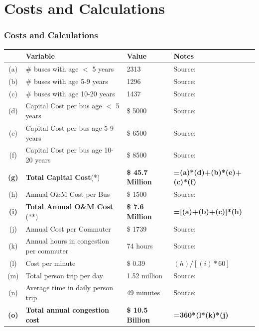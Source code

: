 \documentclass{beamer}
\begin{document}
\section{Costs and Calculations}
\begin{frame}
  \frametitle{Costs and Calculations}
  \begin{table}[h]
\centering
\tiny
\renewcommand{\arraystretch}{1.1}
\begin{tabular}{c l l l}
\hline
 	& Variable 							& Value 				& Notes 						\\\hline\hline
(a)	& \# buses with age $<$ 5 years				& 2313				& Source:	 \cite{am1}	\\
(b)	& \# buses with age 5-9 years				& 1296				& Source:	\cite{am1}					\\
(c)	& \# buses with age 10-20 years			& 1437				& Source:	\cite{am1}					\\
(d)	& Capital Cost per bus age $<$ 5 years		& \$ 5000				& Source:	\cite{am1}		\\
(e)	& Capital Cost per bus age 5-9 years		& \$ 6500				& Source:	\cite{am1}		\\
(f)	& Capital Cost per bus age 10-20 years		& \$ 8500				& Source:	\cite{am1}		\\
\textbf{(g)}	& \textbf{Total Capital Cost}(*)			& \textbf{\$ 45.7 Million}	& \textbf{=(a)*(d)+(b)*(e)+(c)*(f)}			\\
(h)	& Annual O\&M Cost per Bus				& \$ 1500				& Source:	\cite{am1}	\\
\textbf{(i)}	& \textbf{Total Annual O\&M Cost} (**)	& \textbf{\$
  7.6 Million}	& \textbf{=[(a)+(b)+(c)]*(h)}\\
(j)	& Annual Cost per Commuter				& \$ 1739				& Source:	\cite{UMR}	\\
(k)	& Annual hours in congestion per commuter	& 74 hours			& Source:	\cite{UMR} 	\\
(l)	& Cost per minute 						& \$ 0.39				& $(h)/[(i)*60]$		\\
(m)	& Total person trip per day					& 1.52 million			& Source: 	\cite{nyctransit}	\\
(n)	& Average time in daily person trip			& 49 minutes			& Source:	\cite{nyctransit}	\\
\textbf{(o)}	& \textbf{Total annual congestion cost}	& \textbf{\$ 10.5 Billion}	& \textbf{=360*(l*(k)*(j)}			\\\hline\hline
\end{tabular}
\end{table}%
\end{frame}
\end{document}
